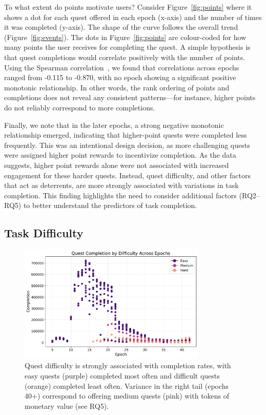 To what extent do points motivate users? Consider Figure~\ref{fig:points} where it shows a dot for each quest offered in each epoch (x-axis) and the number of times it was completed (y-axis). The shape of the curve follows the overall trend (Figure~\ref{fig:events}). The dots in Figure~\ref{fig:points} are colour-coded for how many points the user receives for completing the quest. A simple hypothesis is that quest completions would correlate positively with the number of points. Using the Spearman correlation~\cite{Spe04}, we found that correlations across epochs ranged from -0.115 to -0.870, with no epoch showing a significant positive monotonic relationship. In other words, the rank ordering of points and completions does not reveal any consistent patterns—for instance, higher points do not reliably correspond to more completions.

Finally, we note that in the later epochs, a strong negative monotonic relationship emerged, indicating that higher-point quests were completed less frequently. This was an intentional design decision, as more challenging quests were assigned higher point rewards to incentivize completion. As the data suggests, higher point rewards alone were not associated with increased engagement for these harder quests. Instead, quest difficulty, and other factors that act as deterrents, are more strongly associated with variations in task completion. This finding highlights the need to consider additional factors (RQ2–RQ5) to better understand the predictors of task completion.


\subsection{Task Difficulty}

\begin{figure}[t]
    \centering
    \includegraphics[width=0.8\textwidth]{figures/difficulty.pdf}
    \caption{Quest difficulty is strongly associated with completion rates, with easy quests (purple) completed most often and difficult quests (orange) completed least often. Variance in the right tail (epochs 40+) correspond to offering medium quests (pink) with tokens of monetary value (see RQ5).\label{fig:difficulty}}
\end{figure}

